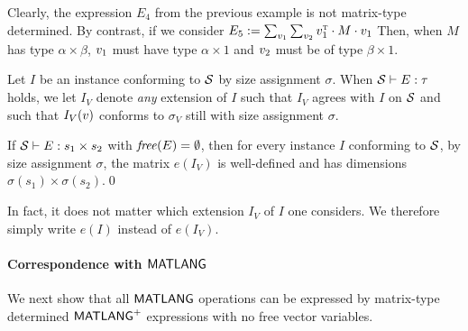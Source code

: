 
\begin{example}
Clearly, the expression $E_4$ from the previous example is not matrix-type determined. By contrast, if we consider
$E_5:=\sum_{v_1}\sum_{v_2} v_1^{\textsc{t}}\cdot M\cdot v_1$
Then, when $M$ has type $\alpha\times \beta$, $v_1$ must have type $\alpha\times 1$ and
$v_2$ must be of type $\beta\times 1$.
\end{example}

Let $I$ be an instance conforming to $\mathcal{S}$
by size assignment $\sigma$. When  $\mathcal{S}\vdash E:\tau$ holds, we let
$I_V$ denote \textit{any} extension of $I$ such that $I_V$ agrees with $I$ on $\mathcal{S}$ and such that
$I_V(v)$ conforms to $\sigma_V$ still with size assignment $\sigma$.



\begin{proposition}
If $\mathcal{S} \vdash E : s_1 \times s_2$ with $\operatorname{\mathit{free}}(E)=\emptyset$, then for every instance $I$
conforming to $\mathcal{S}$, by size assignment $\sigma$, the
matrix $e(I_V)$ is well-defined and has dimensions
$\sigma(s_1) \times \sigma(s_2)$.\qed
\end{proposition}

In fact, it does not matter which extension $I_V$ of $I$ one considers. We therefore
simply write $e(I)$ instead of $e(I_V)$.

\paragraph{Correspondence with $\mathsf{MATLANG}$}
We next show that all $\mathsf{MATLANG}$ operations can be expressed by matrix-type determined $\mathsf{MATLANG}^{\sf +}$ expressions with no
free vector variables.

